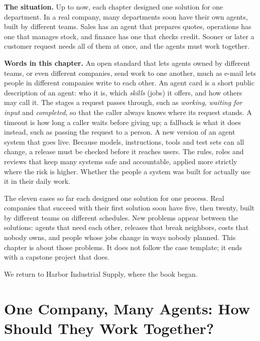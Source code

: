 \begin{beforeyoustart}
\textbf{The situation.} Up to now, each chapter designed one solution for one department. In a real company, many departments soon have their own agents, built by different teams. Sales has an agent that prepares quotes, operations has one that manages stock, and finance has one that checks credit. Sooner or later a customer request needs all of them at once, and the agents must work together.

\textbf{Words in this chapter.}
 An open standard that lets agents owned by different teams, or even different companies, send work to one another, much as e-mail lets people in different companies write to each other.
 An agent card is a short public description of an agent: who it is, which \emph{skills} (jobs) it offers, and how others may call it.
 The stages a request passes through, such as \emph{working}, \emph{waiting for input} and \emph{completed}, so that the caller always knows where its request stands.
 A timeout is how long a caller waits before giving up; a fallback is what it does instead, such as passing the request to a person.
 A new version of an agent system that goes live. Because models, instructions, tools and test sets can all change, a release must be checked before it reaches users.
 The rules, roles and reviews that keep many systems safe and accountable, applied more strictly where the risk is higher.
 Whether the people a system was built for actually use it in their daily work.
\end{beforeyoustart}


The eleven cases so far each designed one solution for one process. Real companies that succeed with their first solution soon have five, then twenty, built by different teams on different schedules. New problems appear between the solutions: agents that need each other, releases that break neighbors, costs that nobody owns, and people whose jobs change in ways nobody planned. This chapter is about those problems. It does not follow the case template; it ends with a capstone project that does.

We return to Harbor Industrial Supply, where the book began.

\section{One Company, Many Agents: How Should They Work Together?}
\label{sec:cap-company}

